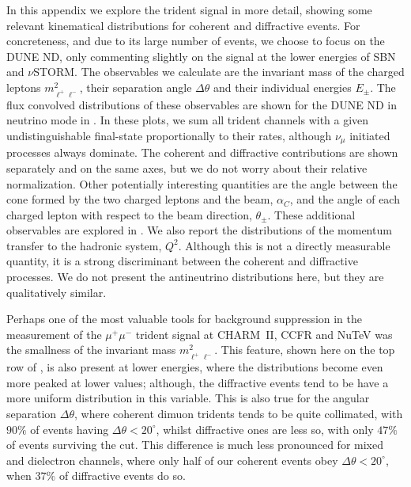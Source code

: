 \graphicspath{{}{appendices/figs/}{appendices/}}
\label{subsec:kine}

In this appendix we explore the trident signal in more detail, showing some relevant kinematical distributions for coherent and diffractive events. For concreteness, and due to its large number of events, we choose to focus on the DUNE ND, only commenting slightly on the signal at the lower energies of SBN and $\nu$STORM. The observables we calculate are the invariant mass of the charged leptons $m^2_{\ell^+ \ell^-}$, their separation angle $\Delta \theta$ and their individual energies $E_\pm$. The flux convolved distributions of these observables are shown for the DUNE ND in neutrino mode in . In these plots, we sum all trident channels with a given undistinguishable final-state proportionally to their rates, although $\nu_\mu$ initiated processes always dominate. The coherent and diffractive contributions are shown separately and on the same axes, but we do not worry about their relative normalization. Other potentially interesting quantities are the angle between the cone formed by the two charged leptons and the beam, $\alpha_C$, and the angle of each charged lepton with respect to the beam direction, $\theta_\pm$.  These additional observables are explored in . We also report the distributions of the momentum transfer to the hadronic system, $Q^2$. Although this is not a directly measurable quantity, it is a strong discriminant between the coherent and diffractive processes. We do not present the antineutrino distributions here, but they are qualitatively similar.

Perhaps one of the most valuable tools for background suppression in the measurement of the $\mu^+\mu^-$ trident signal at CHARM~II, CCFR and NuTeV \cite{Geiregat:1990gz,Mishra:1991bv,Adams:1998yf} was the smallness of the invariant mass $m^2_{\ell^+ \ell^-}$. This feature, shown here on the top row of , is also present at lower energies, where the distributions become even more peaked at lower values; although, the diffractive events tend to be have a more uniform distribution in this variable. This is also true for the angular separation $\Delta \theta$, where coherent dimuon tridents tends to be quite collimated, with $90\%$ of events having $\Delta \theta < 20^\circ$, whilst diffractive ones are less so, with only $47\%$ of events surviving the cut. This difference is much less pronounced for mixed and dielectron channels, where only half of our coherent events obey $\Delta \theta < 20^\circ$, when $37\%$ of diffractive events do so.

